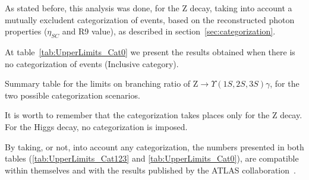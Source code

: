 As stated before, this analysis was done, for the Z decay, taking into account a mutually excludent categorization of events, based on the reconstructed photon properties ($\eta_{SC}$ and R9 value), as described in section~\ref{sec:categorization}. 

At table~\ref{tab:UpperLimits_Cat0} we present the results obtained when there is no categorization of events (Inclusive category).

\begin{table}[ht]
\begin{center}
% 

\caption{Summary table for the limits on branching ratio of $\mathrm{Z}\to\Upsilon(1S,2S,3S)\gamma$, for the two possible categorization scenarios.}
\label{tab:UpperLimits_Cat0}
\end{center}
\end{table}


It is worth to remember that the categorization takes places only for the Z decay. For the Higgs decay, no categorization is imposed.

By taking, or not, into account any categorization, the numbers presented in both tables (\ref{tab:UpperLimits_Cat123} and \ref{tab:UpperLimits_Cat0}), are compatible within themselves and with the results published by the ATLAS collaboration~\cite{Aaboud_2018}.


\clearpage
